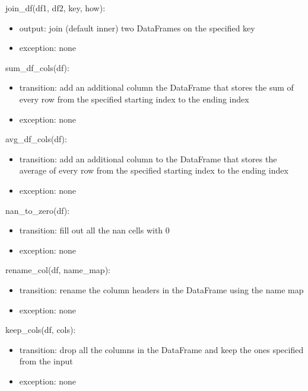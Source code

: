 \documentclass[12pt]{article}
\begin{document}
\noindent join\_df(df1, df2, key, how):
\begin{itemize}
    \item output: join (default inner) two DataFrames on the specified key 
    \item exception: none
\end{itemize}

\noindent sum\_df\_cols(df):
\begin{itemize}
    \item transition: add an additional column the DataFrame that stores the sum of 
    every row from the specified starting index to the ending index
    \item exception: none
\end{itemize}

\noindent avg\_df\_cols(df):
\begin{itemize}
    \item transition: add an additional column to the DataFrame that stores the average of 
    every row from the specified starting index to the ending index
    \item exception: none
\end{itemize}

\noindent nan\_to\_zero(df):
\begin{itemize}
    \item transition: fill out all the nan cells  with $0$
    \item exception: none
\end{itemize}

\noindent rename\_col(df, name\_map):
\begin{itemize}
    \item transition: rename the column headers in the DataFrame using the name map
    \item exception: none
\end{itemize}

\noindent keep\_cols(df, cols):
\begin{itemize}
    \item transition: drop all the columns in the DataFrame and keep the ones specified from the input
    \item exception: none
\end{itemize}

\end{document}
